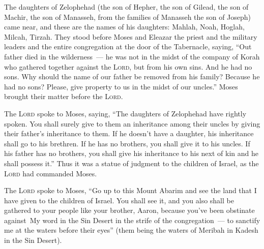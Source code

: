 
\begin{inparaenum}
   The daughters of Zelophehad (the son of Hepher, the son of Gilead, the son of Machir, the son of Manasseh, from the families of Manasseh the son of Joseph) came near, and these are the names of his daughters: Mahlah, Noah, Hoglah, Milcah, Tirzah.%
   They stood before Moses and Eleazar the priest and the military leaders and the entire congregation at the door of the Tabernacle, saying,%
   ``Out father died in the wilderness~--- he was not in the midst of the company of Korah who gathered together against the \textsc{Lord}, but from his own sins. And he had no sons.%
   Why should the name of our father be removed from his family? Because he had no sons? Please, give property to us in the midst of our uncles.''%
   Moses brought their matter before the \textsc{Lord}.%
  
   The \textsc{Lord} spoke to Moses, saying,%
   ``The daughters of Zelophehad have rightly spoken. You shall surely give to them an inheritance among their uncles by giving their father's inheritance to them.%
   If he doesn't have a daughter, his inheritance shall go to his brethren.%
   If he has no brothers, you shall give it to his uncles.%
   If his father has no brothers, you shall give his inheritance to his next of kin and he shall possess it.'' Thus it was a statue of judgment to the children of Israel, as the \textsc{Lord} had commanded Moses.%
  
   The \textsc{Lord} spoke to Moses, ``Go up to this Mount Abarim and see the land that I have given to the children of Israel.%
   You shall see it, and you also shall be gathered to your people like your brother, Aaron,%
   because you've been obstinate against\understood\ My word in the Sin Desert in the strife of the congregation~--- to sanctify me at the waters before their eyes'' (them being the waters of Meribah in Kadesh in the Sin Desert).%
  

\end{inparaenum}
